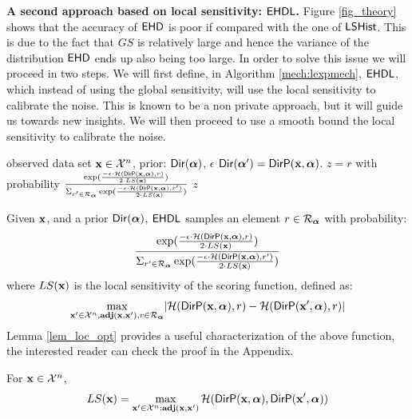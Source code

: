 \documentclass{article}
\begin{document}
\noindent \textbf{A second approach based on local sensitivity: $\lexpmech$.}
\label{sec_ehdl}
Figure \ref{fig_theory} shows that  the accuracy of
$\mathsf{EHD}$ is poor if compared with the one of $\mathsf{LSHist}$. This is due to the fact that
$GS$ is relatively large and hence the variance of the distribution $\mathsf{EHD}$ ends up also being too large. In order to solve this issue we
will proceed in two steps. We will first define, in Algorithm   \ref{mech:lexpmech}, $\lexpmech$, which instead of using the global sensitivity, will use the local sensitivity to calibrate
the noise. This is known to be a non private approach, but it will guide us towards new insights.
We will then proceed to use a smooth bound the local sensitivity to
calibrate the noise.

  \begin{algorithm}
  \caption{$\lexpmech$}
  \label{mech:lexpmech}
  \begin{algorithmic}
  \INPUT observed data set $\textbf{x} \in \mathcal{X}^n$, prior: $\mathsf{Dir}(\boldsymbol{\alpha})$, $\epsilon$
  \STATE {} $\mathsf{Dir}(\boldsymbol{\alpha}')= \mathsf{DirP}(\textbf{x},\boldsymbol{\alpha})$.
  \STATE {} $z=r$ with probability $\frac
  {\exp(\frac{-\epsilon\cdot \mathcal{H}(\mathsf{DirP}(\textbf{x},\boldsymbol{\alpha}), r)}{2\cdot LS(\textbf{x})})}
{\Sigma_{r' \in \mathcal{R}_{\boldsymbol{\alpha}}}\exp(\frac{-\epsilon\cdot \mathcal{H}(\mathsf{DirP}(\textbf{x},\boldsymbol{\alpha}), r')}{2\cdot LS(\textbf{x})})}$
 $z$
  \end{algorithmic}
  \end{algorithm}


Given $\textbf{x}$, and a prior $\mathsf{Dir}(\boldsymbol{\alpha})$, $\lexpmech$ samples an element $r \in \mathcal{R}_{\boldsymbol{\alpha}}$ with probability:
\[
 \frac
  {\exp(\frac{-\epsilon\cdot \mathcal{H}(\mathsf{DirP}(\textbf{x},\boldsymbol{\alpha}), r)}{2\cdot LS(\textbf{x})})}
{\Sigma_{r' \in \mathcal{R}_{\boldsymbol{\alpha}}}\exp(\frac{-\epsilon\cdot \mathcal{H}(\mathsf{DirP}(\textbf{x},\boldsymbol{\alpha}), r')}{2\cdot LS(\textbf{x})})}
\]
where $LS(\textbf{x})$ is the local sensitivity of the scoring function, defined as:
\begin{equation}\label{eq:local_sensitivity_scoring}
\max_{\textbf{x}'\in\mathcal{X}^n,\textbf{adj}(\textbf{x},\textbf{x}'), r\in \mathcal{R}_{\boldsymbol{\alpha}}}\lvert \mathcal{H}(\mathsf{DirP}(\textbf{x},\boldsymbol{\alpha}), r) - \mathcal{H}(\mathsf{DirP}(\textbf{x}',\boldsymbol{\alpha}), r)\rvert 
\end{equation}
Lemma \ref{lem_loc_opt}  provides a useful characterization of the above function, the interested reader can check the proof in the Appendix.
\begin{lem}
\label{lem_loc_opt}
For $\textbf{x}\in\mathcal{X}^n$, 
\[LS(\textbf{x}) = \max\limits_{\textbf{x}' \in \mathcal{X}^n:\textbf{adj}(\textbf{x},\textbf{x}')} \mathcal{H}(\mathsf{DirP}(\textbf{x},\boldsymbol{\alpha}), \mathsf{DirP}(\textbf{x}',\boldsymbol{\alpha}))\]
\end{lem}
\end{document}
